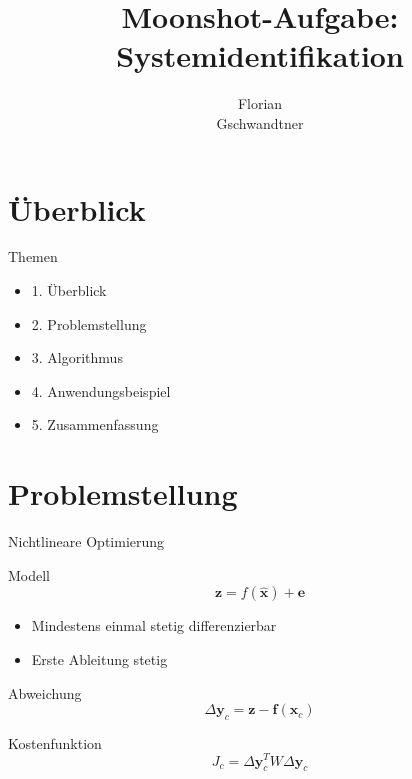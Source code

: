 \documentclass[8pt, t, aspectratio=169,%
]{beamer}
\title{Moonshot-Aufgabe: \\ Systemidentifikation}
\author[Florian Gschwandtner]{Florian \\ Gschwandtner}
\institute{IFR}
\begin{document}
\begin{frame}[plain]
  \titlepage
\end{frame}


\section{Überblick} %

\begin{frame}{Themen}
	\begin{itemize}\huge
		\item[]	1. Überblick
		\item[] 2. Problemstellung
		\item[] 3. Algorithmus
		\item[] 4. Anwendungsbeispiel
		\item[] 5. Zusammenfassung
	\end{itemize}

\end{frame}


\section{Problemstellung}

\begin{frame}{Nichtlineare Optimierung}\LARGE

Modell
\begin{equation}
	\textbf{z} =  f(\hat{\textbf{x}})+\textbf{e}
\end{equation}

\begin{itemize}
	\item Mindestens einmal stetig differenzierbar
	\item Erste Ableitung stetig
\end{itemize}

Abweichung
\begin{equation}
	\Delta \textbf{y}_c = \textbf{z}-\textbf{f}(\textbf{x}_c)
\end{equation}\label{deltayc}


Kostenfunktion
\begin{equation}
	J_c = \Delta \textbf{y}_c^T W \Delta \textbf{y}_c
\end{equation}\label{jc}

\end{frame}
\end{document}
